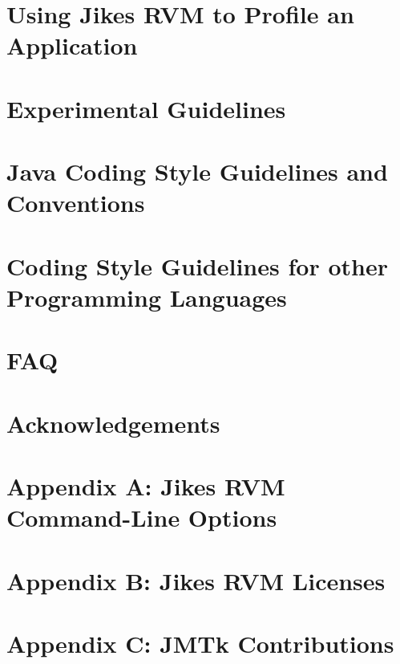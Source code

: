 \documentclass{article}
\newcommand{\jrvm}{Jikes RVM}
\begin{document}
\T \newpage
{}
\section{Using \jrvm{} to Profile an Application}


\T \newpage
{}
\section{Experimental Guidelines}


\T \newpage
{}
\section{Java Coding Style Guidelines and Conventions}
\label{section:javacodingstyle}


\T \newpage
{}
\section{Coding Style Guidelines for other Programming Languages}
\label{section:codingstyle-nonjava}


\T \newpage
{}
\section{FAQ}


\T \newpage
\section*{Acknowledgements}


\T \newpage
\T 
\T 

\T \newpage

\T \appendix

\section{Appendix A: Jikes RVM Command-Line Options}
\label{appendix:nonadaptive:cmdline}


\T \newpage
{}
\section{Appendix B: Jikes RVM Licenses}
\label{appendix:licenses}


\T \newpage
{}
\section{Appendix C: JMTk Contributions}
\label{appendix:contributions}


\W \section*{\indexname}\label{hlxindex}
\W \htmlprintindex
\T \printindex

 \W {}
 \W 
\end{document}
